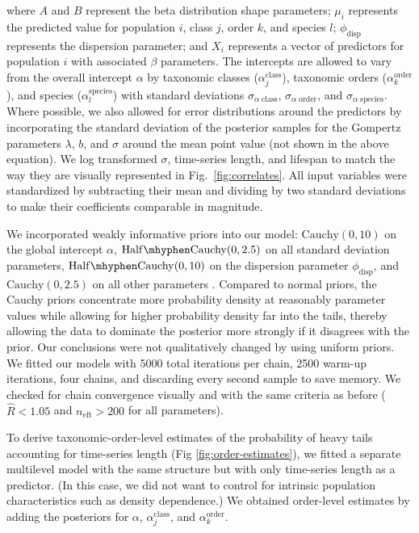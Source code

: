 where $A$ and $B$ represent the beta distribution shape parameters; $\mu_i$ represents the predicted value for population $i$, class $j$, order $k$, and species $l$; $\phi_\mathrm{disp}$ represents the dispersion parameter; and $X_i$ represents a vector of predictors for population $i$ with associated $\beta$ parameters. The intercepts are allowed to vary from the overall intercept $\alpha$ by taxonomic classes ($\alpha^\mathrm{class}_j$), taxonomic orders ($\alpha^\mathrm{order}_k$), and species ($\alpha^\mathrm{species}_l$) with standard deviations $\sigma_{\alpha \; \mathrm{class}}$, $\sigma_{\alpha \; \mathrm{order}}$, and $\sigma_{\alpha \; \mathrm{species}}$. Where possible, we also allowed for error distributions around the predictors by incorporating the standard deviation of the posterior samples for the Gompertz parameters $\lambda$, $b$, and $\sigma$ around the mean point value (not shown in the above equation). We log transformed $\sigma$, time-series length, and lifespan to match the way they are visually represented in Fig.~\ref{fig:correlates}. All input variables were standardized by subtracting their mean and dividing by two standard deviations \citep{gelman2008c} to make their coefficients comparable in magnitude.

We incorporated weakly informative priors into our model: $\mathrm{Cauchy}(0, 10)$ on the global intercept $\alpha$, $\mathrm{Half\mhyphen Cauchy}(0, 2.5)$ on all standard deviation parameters, $\mathrm{Half\mhyphen Cauchy}(0, 10)$ on the dispersion parameter $\phi_\mathrm{disp}$, and $\mathrm{Cauchy}(0, 2.5)$ on all other parameters \citep{gelman2006c,gelman2008d}. Compared to normal priors, the Cauchy priors concentrate more probability density at reasonably parameter values while allowing for higher probability density far into the tails, thereby allowing the data to dominate the posterior more strongly if it disagrees with the prior. Our conclusions were not qualitatively changed by using uniform priors. We fitted our models with 5000 total iterations per chain, 2500 warm-up iterations, four chains, and discarding every second sample to save memory. We checked for chain convergence visually and with the same criteria as before ($\widehat{R} < 1.05$ and $n_\mathrm{eft} >200$ for all parameters).

To derive taxonomic-order-level estimates of the probability of heavy tails accounting for time-series length (Fig \ref{fig:order-estimates}), we fitted a separate multilevel model with the same structure but with only time-series length as a predictor. (In this case, we did not want to control for intrinsic population characteristics such as density dependence.) We obtained order-level estimates by adding the posteriors for $\alpha$, $\alpha^\mathrm{class}_j$, and $\alpha^\mathrm{order}_k$.



